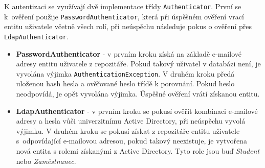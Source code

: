 K autentizaci se využívají dvě implementace třídy \texttt{Authenticator}. První se k~ověření použije \texttt{PasswordAuthenticator}, která při úspěšném ověření vrací entitu uživatele včetně všech rolí, při neúspěchu následuje pokus o ověření přes \texttt{LdapAuthenticator}.

\begin{itemize}
	\item \textbf{PasswordAuthenticator} - v prvním kroku získá na základě e-mailové adresy entitu uživatele z repozitáře. Pokud takový uživatel v databázi není, je vyvolána výjimka \texttt{AuthenticationException}. V druhém kroku předá uloženou hash hesla a ověřované heslo třídě  k porovnání. Pokud heslo neodpovídá, je opět vyvolána výjimka. Úspěšné ověření vrátí získanou entitu.
	\item \textbf{LdapAuthenticator} - v prvním kroku se pokusí ověřit kombinaci e-mailové adresy a hesla vůči univerzitnímu Active Directory, při neúspěchu vyvolá výjimku. V druhém kroku se pokusí získat z repozitáře entitu uživatele s~odpovídající \mbox{e-mailovou} adresou, pokud takový neexistuje, je vytvořena nová entita s rolemi získanými z Active Directory. Tyto role jsou buď \textit{Student} nebo \textit{Zaměstnanec}.
\end{itemize}

